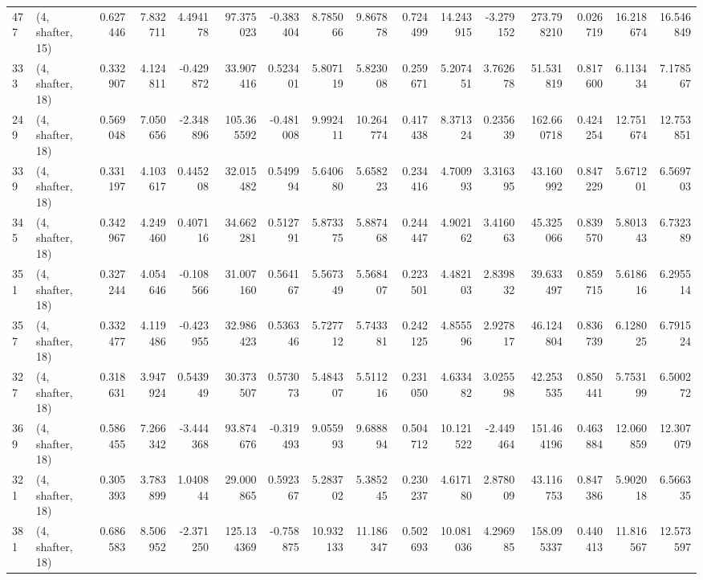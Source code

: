 \begin{tabular}{llrrrrrrrrrrrrrr}
477 &  (4, shafter, 15) &   0.627446 &   7.832711 &   4.494178 &    97.375023 &  -0.383404 &   8.785066 &   9.867878 &  0.724499 &  14.243915 &  -3.279152 &   273.798210 &  0.026719 &  16.218674 &  16.546849 \\
333 &  (4, shafter, 18) &   0.332907 &   4.124811 &  -0.429872 &    33.907416 &   0.523401 &   5.807119 &   5.823008 &  0.259671 &   5.207451 &   3.762678 &    51.531819 &  0.817600 &   6.113434 &   7.178567 \\
249 &  (4, shafter, 18) &   0.569048 &   7.050656 &  -2.348896 &   105.365592 &  -0.481008 &   9.992411 &  10.264774 &  0.417438 &   8.371324 &   0.235639 &   162.660718 &  0.424254 &  12.751674 &  12.753851 \\
339 &  (4, shafter, 18) &   0.331197 &   4.103617 &   0.445208 &    32.015482 &   0.549994 &   5.640680 &   5.658223 &  0.234416 &   4.700993 &   3.316395 &    43.160992 &  0.847229 &   5.671201 &   6.569703 \\
345 &  (4, shafter, 18) &   0.342967 &   4.249460 &   0.407116 &    34.662281 &   0.512791 &   5.873375 &   5.887468 &  0.244447 &   4.902162 &   3.416063 &    45.325066 &  0.839570 &   5.801343 &   6.732389 \\
351 &  (4, shafter, 18) &   0.327244 &   4.054646 &  -0.108566 &    31.007160 &   0.564167 &   5.567349 &   5.568407 &  0.223501 &   4.482103 &   2.839832 &    39.633497 &  0.859715 &   5.618616 &   6.295514 \\
357 &  (4, shafter, 18) &   0.332477 &   4.119486 &  -0.423955 &    32.986423 &   0.536346 &   5.727712 &   5.743381 &  0.242125 &   4.855596 &   2.927817 &    46.124804 &  0.836739 &   6.128025 &   6.791524 \\
327 &  (4, shafter, 18) &   0.318631 &   3.947924 &   0.543949 &    30.373507 &   0.573073 &   5.484307 &   5.511216 &  0.231050 &   4.633482 &   3.025598 &    42.253535 &  0.850441 &   5.753199 &   6.500272 \\
369 &  (4, shafter, 18) &   0.586455 &   7.266342 &  -3.444368 &    93.874676 &  -0.319493 &   9.055993 &   9.688894 &  0.504712 &  10.121522 &  -2.449464 &   151.464196 &  0.463884 &  12.060859 &  12.307079 \\
321 &  (4, shafter, 18) &   0.305393 &   3.783899 &   1.040844 &    29.000865 &   0.592367 &   5.283702 &   5.385245 &  0.230237 &   4.617180 &   2.878009 &    43.116753 &  0.847386 &   5.902018 &   6.566335 \\
381 &  (4, shafter, 18) &   0.686583 &   8.506952 &  -2.371250 &   125.134369 &  -0.758875 &  10.932133 &  11.186347 &  0.502693 &  10.081036 &   4.296985 &   158.095337 &  0.440413 &  11.816567 &  12.573597 \\

\end{tabular}
